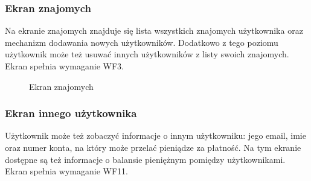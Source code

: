 \clearpage
\subsubsection{Ekran znajomych}
Na ekranie znajomych znajduje się lista wszystkich znajomych użytkownika oraz mechanizm dodawania nowych użytkowników. Dodatkowo z tego poziomu użytkownik może też usuwać innych użytkowników z listy swoich znajomych. Ekran spełnia wymaganie WF3.

\begin{figure}[h!]%
    \centering
    \qquad
    \caption{Ekran znajomych}%
\end{figure}

\clearpage
\subsubsection{Ekran innego użytkownika}
Użytkownik może też zobaczyć informacje o innym użytkowniku: jego email, imie oraz numer konta, na który może przelać pieniądze za płatność. Na tym ekranie dostępne są też informacje o balansie pieniężnym pomiędzy użytkownikami. Ekran spełnia wymaganie WF11.

\begin{figure}[h!]%
    \centering
\end{figure}
